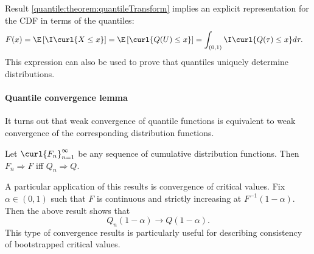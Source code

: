  Result \ref{quantile:theorem:quantileTransform}  implies an explicit representation for the CDF in terms of the quantiles:
 \begin{align}
 	F(x) & = \E\left[ \I\curl{X\leq x} \right] = \E\left[ \curl{Q(U) \leq x } \right] = \int_{(0, 1)} \I\curl{ Q(\tau)\leq x  }d\tau.
 \end{align}
 This expression can also be used to prove that quantiles uniquely determine distributions.
 
 
 \paragraph{Quantile convergence lemma} 
 
 It turns out that weak convergence of quantile functions is equivalent to weak convergence of the corresponding distribution functions.
 
 \begin{cl}
%  
Let $\curl{F_n}_{n=1}^{\infty}$ be any sequence of cumulative distribution functions. Then  $F_n\Rightarrow F$ iff $Q_n\Rightarrow Q$. 
 \end{cl}
 A particular application of this results is convergence of critical values. Fix $\alpha \in (0, 1)$ such that $F$ is continuous and strictly increasing at $F^{-1}(1-\alpha)$. Then the above result shows that
 	\begin{equation}
 			Q_n(1-\alpha) \to Q(1-\alpha).
 	\end{equation} 
 	This type of convergence results is particularly useful for describing consistency of bootstrapped critical values.
 
